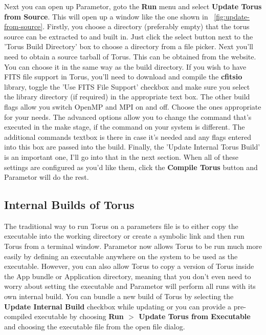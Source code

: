 \documentclass[a4paper,10pt]{article}
\newcommand{\figref}[2][\figurename~]{#1\ref{#2}}
\begin{document}
Next you can open up Parametor, goto the \textbf{Run} menu and select \textbf{Update Torus from Source}. This will open up a window like the one shown in \figref{fig:update-from-source}. Firstly, you choose a directory (preferably empty) that the torus source can be extracted to and built in. Just click the select button next to the 'Torus Build Directory' box to choose a directory from a file picker. Next you'll need to obtain a source tarball of Torus. This can be obtained from		 the website. You can choose it in the same way as the build directory. If you wish to have FITS file support in Torus, you'll need to download and compile the \textbf{cfitsio} library, toggle the 'Use FITS File Support' checkbox and make sure you select the library directory (if required) in the appropriate text box. The other build flags allow you switch OpenMP and MPI on and off. Choose the ones appropriate for your needs. The advanced options allow you to change the command that's executed in the make stage, if the command on your system is different. The additional commands textbox is there in case it's needed and any flags entered into this box are passed into the build. Finally, the 'Update Internal Torus Build' is an important one, I'll go into that in the next section. When all of these settings are configured as you'd like them, click the \textbf{Compile Torus} button and Parametor will do the rest.

\subsection{Internal Builds of Torus}
The traditional way to run Torus on a parameters file is to either copy the executable into the working directory or create a symbolic link and then run Torus from a terminal window. Parametor now allows Torus to be run much more easily by defining an executable anywhere on the system to be used as the executable. However, you can also allow Torus to copy a version of Torus inside the App bundle  or Application directory, meaning that you don't even need to worry about setting the executable and Parametor will perform all runs with its own internal build. You can bundle a new build of Torus by selecting the  \textbf{Update Internal Build} checkbox while updating or you can provide a pre-compiled executable by choosing \textbf{Run $>$ Update Torus from Executable} and choosing the executable file from the open file dialog.
\end{document}
